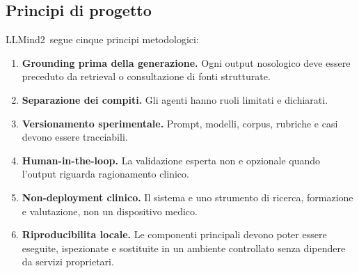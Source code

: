 \documentclass[11pt,a4paper]{article}
\newcommand{\llmind}{LLMind2}
\begin{document}
\subsection{Principi di progetto}
\llmind\ segue cinque principi metodologici:
\begin{enumerate}
  \item \textbf{Grounding prima della generazione.} Ogni output nosologico deve essere preceduto da retrieval o consultazione di fonti strutturate.
  \item \textbf{Separazione dei compiti.} Gli agenti hanno ruoli limitati e dichiarati.
  \item \textbf{Versionamento sperimentale.} Prompt, modelli, corpus, rubriche e casi devono essere tracciabili.
  \item \textbf{Human-in-the-loop.} La validazione esperta non e opzionale quando l'output riguarda ragionamento clinico.
  \item \textbf{Non-deployment clinico.} Il sistema e uno strumento di ricerca, formazione e valutazione, non un dispositivo medico.
  \item \textbf{Riproducibilita locale.} Le componenti principali devono poter essere eseguite, ispezionate e sostituite in un ambiente controllato senza dipendere da servizi proprietari.
\end{enumerate}
\end{document}
